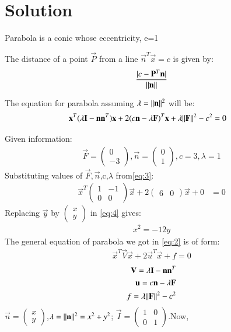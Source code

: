 \documentclass[journal,12pt,twocolumn]{IEEEtran}
\newcommand{\myvec}[1]{\ensuremath{\begin{pmatrix}#1\end{pmatrix}}}
\begin{document}
\section{Solution}
\begin{enumerate}
\begin{lemma}
\label{lemma}
Parabola is a conic whose eccentricity, e=1
\end{lemma}
\begin{lemma}
\label{lemma}
The distance of a point $\vec{P}$ from a line $\vec{n}^T\vec{x}=c$ is given by:
\begin{align}
\frac{\vert c-\mathbf{P}^T\mathbf{n}\vert}{\Vert\mathbf{n}\rVert}   
\end{align}
\end{lemma}
\begin{lemma}
The equation for parabola assuming $\lambda=\Vert\mathbf{n}\rVert^2$ will be: 
\begin{align}
\mathbf{x}^T(\lambda\mathbf{I}-\mathbf{n}\mathbf{n}^T)\mathbf{x}+2(c\mathbf{n}-\lambda\mathbf{F})^T\mathbf{x}+\lambda\Vert\mathbf{F}\rVert^2-c^2&=0\label{eq:2}
\end{align}
\end{lemma}
Given information:
\begin{align}
\vec{F}=\myvec{0\\-3},
\vec{n}=\myvec{0\\1},
c=3,
\lambda=1\label{eq:3}
\end{align}
Substituting values of $\vec{F},\vec{n}$,c,$\lambda$ from\eqref{eq:3}:
\begin{align}
\vec{x}^T\myvec{1&-1\\0&0}\vec{x}+2\myvec{6&0}\vec{x}+0&=0\label{eq:4}
\end{align}
Replacing $\vec{y}$ by $\myvec{x\\y}$ in \eqref{eq:4} gives:
\begin{align}
x^2=-12y
\end{align}
The general equation of parabola we got in \eqref{eq:2} is of form:
\begin{align}
\vec{x}^T\vec{V}\vec{x}+2\vec{u}^T\vec{x}+f=0
\end{align}
\begin{align}
\mathbf{V}=\lambda\mathbf{I}-\mathbf{n}\mathbf{n}^T\\
\mathbf{u}=c\mathbf{n}-\lambda\mathbf{F}\\
f=\lambda\Vert\mathbf{F}\rVert^2-c^2
\end{align}
$\vec{n}=\myvec{x\\y}$,$\lambda=\Vert\mathbf{n}\rVert^2=x^2+y^2$; $\vec{I}=\myvec{1&0\\0&1}$.Now,

\end{enumerate}
\end{document}
